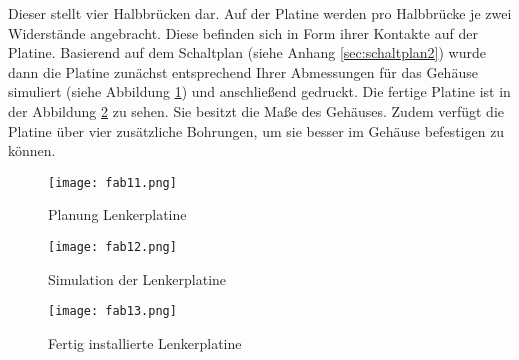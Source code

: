 Dieser stellt vier Halbbrücken dar.
Auf der Platine werden pro Halbbrücke je zwei Widerstände angebracht. Diese befinden sich in Form ihrer Kontakte auf der Platine.
Basierend auf dem Schaltplan (siehe Anhang \ref{sec:schaltplan2}) wurde dann die Platine zunächst entsprechend Ihrer Abmessungen für das Gehäuse simuliert (siehe Abbildung \ref{fig:fab12}) und anschließend gedruckt. Die fertige Platine ist in der Abbildung \ref{fig:fab13} zu sehen. Sie besitzt die Maße des Gehäuses. Zudem verfügt die Platine über vier zusätzliche Bohrungen, um sie besser im Gehäuse befestigen zu können. 
\begin{figure}[htbp]
    \centering
    \begin{minipage}{0.48\textwidth}
        \centering
        \texttt{[image: fab11.png]}
        \caption[Planung Lenkerplatine (Abbildungsverzeichnis)]{Planung Lenkerplatine}
        \label{fig:fab11}
    \end{minipage}
    \hfill
    \begin{minipage}{0.48\textwidth}
        \centering
        \texttt{[image: fab12.png]}
        \caption[Simulation der Lenkerplatine (Abbildungsverzeichnis)]{Simulation der Lenkerplatine}
        \label{fig:fab12}
    \end{minipage}
\end{figure}


\begin{figure}[htbp]
    \begin{center}
        \texttt{[image: fab13.png]}
        \caption[Fertig installierte Lenkerplatine (Abbildungsverzeichnis)]{Fertig installierte Lenkerplatine}
        \label{fig:fab13}
    \end{center}
\end{figure}


\newpage
